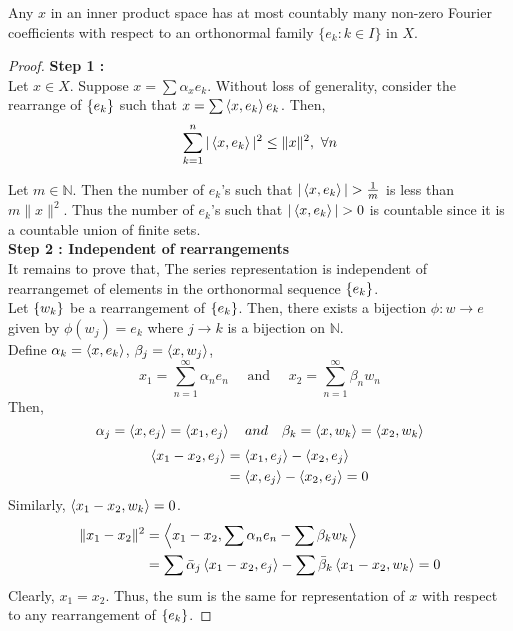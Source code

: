 \begin{lemma}
	Any $x$ in an inner product space has at most countably many non-zero Fourier coefficients with respect to an orthonormal family $\{ e_k : k \in I\}$ in $X$.
\end{lemma}
\begin{proof}
	\textbf{Step 1 : }\\
	Let $x \in X$.
	Suppose $x = \sum \alpha_x e_k$.
	Without loss of generality, consider the rearrange of $\left\{e_k\right\}$ such that $x = \sum \left\langle x,e_k \right\rangle e_k$.
	Then,
	\[ \sum_{k = 1}^n |\inner{x}{e_k}|^2 \le \|x\|^2,\ \forall n \]

	Let $m \in \mathbb{N}$.
	Then the number of $e_k$'s such that $|\left\langle x,e_k \right\rangle| > \frac{1}{m}$ is less than $m\|x\|^2$.
	Thus the number of $e_k$'s such that $|\left\langle x,e_k \right\rangle| > 0$ is countable since it is a countable union of finite sets.\\

	\textbf{Step 2 : Independent of rearrangements}\\
	It remains to prove that, The series representation is independent of rearrangemet of elements in the orthonormal sequence $\left\{e_k\right\}$.\\

	Let $\left\{w_k\right\}$ be a rearrangement of $\left\{e_k\right\}$.
	Then, there exists a bijection $\phi : w \to e$ given by $\phi(w_j) = e_k$ where $j \to k$ is a bijection on $\mathbb{N}$.\\
	
	Define $\alpha_k = \left\langle x,e_k \right\rangle$, $\beta_j = \left\langle x,w_j \right\rangle$,
	\[ x_1 = \sum_{n=1}^\infty \alpha_n e_n \quad \text{ and }\quad x_2 = \sum_{n=1}^\infty \beta_n w_n \]
	Then,
	\[ \alpha_j = \left\langle x,e_j \right\rangle = \left\langle x_1,e_j \right\rangle \quad and \quad \beta_k = \left\langle x,w_k \right\rangle = \left\langle x_2,w_k \right\rangle \]
	\begin{align*}
		\left\langle x_1-x_2,e_j \right\rangle 
		& = \left\langle x_1,e_j \right\rangle - \left\langle x_2,e_j \right\rangle \\
		& = \left\langle x,e_j \right\rangle - \left\langle x_2,e_j \right\rangle = 0
	\end{align*}
	Similarly, $\left\langle x_1-x_2,w_k \right\rangle = 0$.
	\begin{align*}
		\|x_1 - x_2 \|^2 
		& = \left\langle x_1-x_2,\sum \alpha_n e_n - \sum \beta_k w_k \right\rangle \\
		& = \sum \bar{\alpha}_j \left\langle x_1-x_2,e_j \right\rangle - \sum \bar{\beta}_k \left\langle x_1-x_2,w_k \right\rangle = 0
	\end{align*}
	Clearly, $x_1 = x_2$.
	Thus, the sum is the same for representation of $x$ with respect to any rearrangement of $\left\{e_k\right\}$.
\end{proof}

